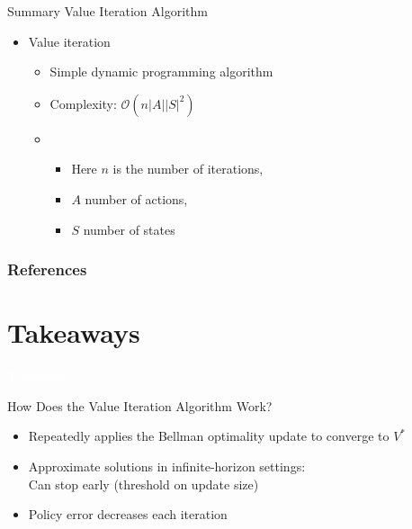 \documentclass[11pt,table]{beamer}
\begin{document}
\begin{frame}{Summary Value Iteration Algorithm}

    \begin{itemize}
        \item Value iteration

        \begin{itemize}
                     
\item Simple dynamic programming algorithm\\[2ex]
\item Complexity: \textcolor{red1}{$\mathcal{O}\left(n|A||S|^{2}\right)$}\\[2ex]
\item[] 
\begin{itemize}
	\item Here $n$ is the number of iterations,\\[2ex]
	\item $A$ number of actions,\\[2ex]
	\item $S$ number of states
\end{itemize}
    \end{itemize}



    \end{itemize}
\end{frame}

\begin{frame}[t,allowframebreaks
]%
\frametitle{References}
\small

\end{frame}
\section{Takeaways}
{
\begin{frame}
\centering
\Huge
\textcolor{white}{Takeaways}
\thispagestyle{empty}
\end{frame}
}

\begin{frame}{How Does the Value Iteration Algorithm Work?}
\begin{itemize}
 \item Repeatedly applies the Bellman optimality update to converge to \(V^*\)
  \item Approximate solutions in infinite‐horizon settings:\\
	Can stop early (threshold on update size)
  \item Policy error decreases each iteration
\end{itemize}
\end{frame}
\end{document}
